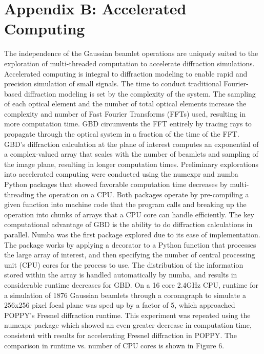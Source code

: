 \section{Appendix B: Accelerated Computing}
\label{sec:appendixB}
The independence of the Gaussian beamlet operations are uniquely suited to the exploration of multi-threaded computation to accelerate diffraction simulations. Accelerated computing is integral to diffraction modeling to enable rapid and precision simulation of small signals. 
The time to conduct traditional Fourier-based diffraction modeling is set by the complexity of the system. The sampling of each optical element and the number of total optical elements increase the complexity and number of Fast Fourier Transforms (FFTs) used, resulting in more computation time. GBD circumvents the FFT entirely by tracing rays to propagate through the optical system in a fraction of the time of the FFT. GBD’s diffraction calculation at the plane of interest computes an exponential of a complex-valued array that scales with the number of beamlets and sampling of the image plane, resulting in longer computation times.  Preliminary explorations into accelerated computing were conducted using the numexpr\cite{robert_mcleod_2018_2483274} and numba\cite{lam_numba_2015} Python packages that showed favorable computation time decreases by multi-threading the operation on a CPU. Both packages operate by pre-compiling a given function into machine code that the program calls and breaking up the operation into chunks of arrays that a CPU core can handle efficiently. The key computational advantage of GBD is the ability to do diffraction calculations in parallel. Numba was the first package explored due to its ease of implementation. The package works by applying a decorator to a Python function that processes the large array of interest, and then specifying the number of central processing unit (CPU) cores for the process to use. The distribution of the information stored within the array is handled automatically by numba, and results in considerable runtime decreases for GBD. On a 16 core 2.4GHz CPU, runtime for a simulation of 1876 Gaussian beamlets through a coronagraph to simulate a 256x256 pixel focal plane was sped up by a factor of 5, which approached POPPY's Fresnel diffraction runtime. This experiment was repeated using the numexpr package which showed an even greater decrease in computation time, consistent with results for accelerating Fresnel diffraction in POPPY\cite{Doug18}. The comparison in runtime vs. number of CPU cores is shown in Figure 6.

